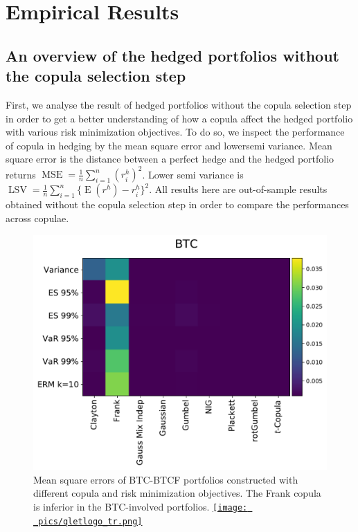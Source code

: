 \section{Empirical Results}\label{sec:results}



\subsection{An overview of the hedged portfolios without the copula selection step}\label{subsec:HP1}
First, we analyse the result of hedged portfolios without the copula selection step in order to get a better understanding of how a copula affect the hedged portfolio with various risk minimization objectives.
To do so, we inspect the performance of copula in hedging by the mean square error and lowersemi variance.
Mean square error is the distance between a perfect hedge and the hedged portfolio returns $\operatorname{MSE}=\frac{1}{n}\sum_{i=1}^n(r^h_i)^2$.
Lower semi variance is $\operatorname{LSV}=\frac{1}{n}\sum_{i=1}^n\{\operatorname{E}(r^h)-r^h_i\}^2$.
All results here are out-of-sample results obtained without the copula selection step in order to compare the performances across copulae.  \medskip

\begin{figure}[th]
    \centering
    \includegraphics[width=\textwidth]{_pics/MSE_BTC.pdf}
  \caption{Mean square errors of BTC-BTCF portfolios constructed with different copula and risk minimization objectives.
    The Frank copula is inferior in the BTC-involved portfolios.
    \href{http://www.quantlet.com/}{\texttt{[image: \_pics/qletlogo\_tr.png]}} }
\label{fig:MSE_BTC}
\end{figure}

